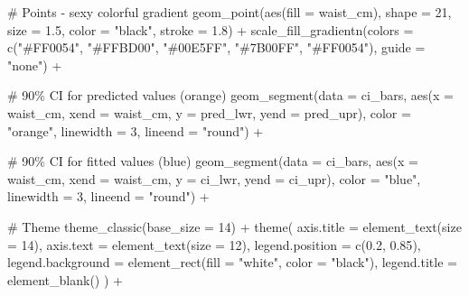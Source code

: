 \documentclass[
  letterpaper,
  DIV=11,
  numbers=noendperiod]{scrreprt}
\newenvironment{Shaded}{\begin{snugshade}}{\end{snugshade}}
\newcommand{\AttributeTok}[1]{\textcolor[rgb]{0.40,0.45,0.13}{#1}}
\newcommand{\CommentTok}[1]{\textcolor[rgb]{0.37,0.37,0.37}{#1}}
\newcommand{\DecValTok}[1]{\textcolor[rgb]{0.68,0.00,0.00}{#1}}
\newcommand{\FloatTok}[1]{\textcolor[rgb]{0.68,0.00,0.00}{#1}}
\newcommand{\FunctionTok}[1]{\textcolor[rgb]{0.28,0.35,0.67}{#1}}
\newcommand{\NormalTok}[1]{\textcolor[rgb]{0.00,0.23,0.31}{#1}}
\newcommand{\SpecialCharTok}[1]{\textcolor[rgb]{0.37,0.37,0.37}{#1}}
\newcommand{\StringTok}[1]{\textcolor[rgb]{0.13,0.47,0.30}{#1}}
\begin{document}
\begin{Shaded}
\begin{Highlighting}[]
  \CommentTok{\# Points {-} sexy colorful gradient}
  \FunctionTok{geom\_point}\NormalTok{(}\FunctionTok{aes}\NormalTok{(}\AttributeTok{fill =}\NormalTok{ waist\_cm), }\AttributeTok{shape =} \DecValTok{21}\NormalTok{, }\AttributeTok{size =} \FloatTok{1.5}\NormalTok{, }\AttributeTok{color =} \StringTok{"black"}\NormalTok{, }\AttributeTok{stroke =} \FloatTok{1.8}\NormalTok{) }\SpecialCharTok{+}
  \FunctionTok{scale\_fill\_gradientn}\NormalTok{(}\AttributeTok{colors =} \FunctionTok{c}\NormalTok{(}\StringTok{"\#FF0054"}\NormalTok{, }\StringTok{"\#FFBD00"}\NormalTok{, }\StringTok{"\#00E5FF"}\NormalTok{, }\StringTok{"\#7B00FF"}\NormalTok{, }\StringTok{"\#FF0054"}\NormalTok{),}
                       \AttributeTok{guide =} \StringTok{"none"}\NormalTok{) }\SpecialCharTok{+}
  
  \CommentTok{\# 90\% CI for predicted values (orange)}
  \FunctionTok{geom\_segment}\NormalTok{(}\AttributeTok{data =}\NormalTok{ ci\_bars, }
               \FunctionTok{aes}\NormalTok{(}\AttributeTok{x =}\NormalTok{ waist\_cm, }\AttributeTok{xend =}\NormalTok{ waist\_cm, }\AttributeTok{y =}\NormalTok{ pred\_lwr, }\AttributeTok{yend =}\NormalTok{ pred\_upr),}
               \AttributeTok{color =} \StringTok{"orange"}\NormalTok{, }\AttributeTok{linewidth =} \DecValTok{3}\NormalTok{, }\AttributeTok{lineend =} \StringTok{"round"}\NormalTok{) }\SpecialCharTok{+}
  
  \CommentTok{\# 90\% CI for fitted values (blue)}
  \FunctionTok{geom\_segment}\NormalTok{(}\AttributeTok{data =}\NormalTok{ ci\_bars, }
               \FunctionTok{aes}\NormalTok{(}\AttributeTok{x =}\NormalTok{ waist\_cm, }\AttributeTok{xend =}\NormalTok{ waist\_cm, }\AttributeTok{y =}\NormalTok{ ci\_lwr, }\AttributeTok{yend =}\NormalTok{ ci\_upr),}
               \AttributeTok{color =} \StringTok{"blue"}\NormalTok{, }\AttributeTok{linewidth =} \DecValTok{3}\NormalTok{, }\AttributeTok{lineend =} \StringTok{"round"}\NormalTok{) }\SpecialCharTok{+}
  
  \CommentTok{\# Theme}
  \FunctionTok{theme\_classic}\NormalTok{(}\AttributeTok{base\_size =} \DecValTok{14}\NormalTok{) }\SpecialCharTok{+}
  \FunctionTok{theme}\NormalTok{(}
    \AttributeTok{axis.title =} \FunctionTok{element\_text}\NormalTok{(}\AttributeTok{size =} \DecValTok{14}\NormalTok{),}
    \AttributeTok{axis.text =} \FunctionTok{element\_text}\NormalTok{(}\AttributeTok{size =} \DecValTok{12}\NormalTok{),}
    \AttributeTok{legend.position =} \FunctionTok{c}\NormalTok{(}\FloatTok{0.2}\NormalTok{, }\FloatTok{0.85}\NormalTok{),}
    \AttributeTok{legend.background =} \FunctionTok{element\_rect}\NormalTok{(}\AttributeTok{fill =} \StringTok{"white"}\NormalTok{, }\AttributeTok{color =} \StringTok{"black"}\NormalTok{),}
    \AttributeTok{legend.title =} \FunctionTok{element\_blank}\NormalTok{()}
\NormalTok{  ) }\SpecialCharTok{+}
  

\end{Highlighting}
\end{Shaded}
\end{document}
